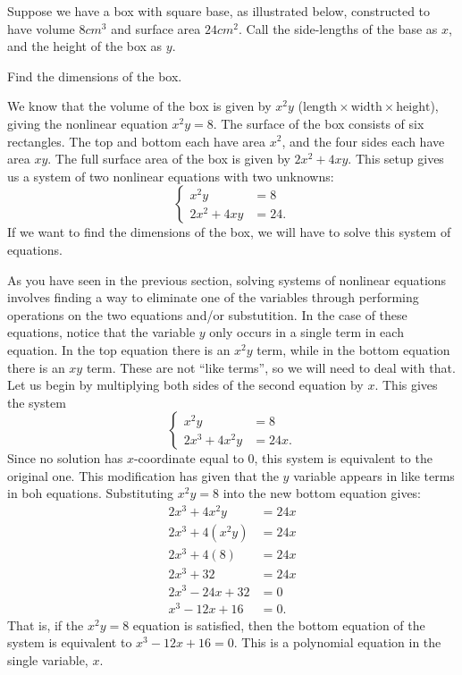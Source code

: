 \documentclass[nooutcomes]{ximera}
\begin{document}
	\begin{exercise}
		Suppose we have a box with square base, as illustrated below, constructed to have volume $8 cm^3$ and surface area $24 cm^2$. 
		Call the side-lengths of the base as $x$, and the height of the box as $y$.
		\begin{image}
		\end{image}
		Find the dimensions of the box.
		
		\begin{explanation}	
			We know that the volume of the box is given by $x^2y$ ($\text{length} \times \text{width} \times \text{height}$), giving the nonlinear equation
			 $x^2y = 8$. The surface of the box consists of six rectangles. The top and bottom each have area $x^2$, and the four sides each have 
			 area $xy$. The full surface area of the box is given by $2x^2 + 4xy$.
			This setup gives us a system of two nonlinear equations with two unknowns:
			$$	\begin{cases}
					x^2 y &= 8\\
					2x^2 + 4xy &= 24.
				\end{cases}	$$
			If we want to find the dimensions of the box, we will have to solve this system of equations.
			
			As you have seen in the previous section, solving systems of nonlinear equations involves finding a way to eliminate one of the variables through 
			performing operations on the two equations and/or substutition. In the case of these equations, notice that the variable $y$ only occurs in a single
			term in each equation. In the top equation there is an $x^2 y$ term, while in the bottom equation there is an $xy$ term. These are not 
			``like terms'', so we will need to deal with that. Let us begin by multiplying both sides of the second equation by $x$. This gives the system
			$$	\begin{cases}
					x^2 y &= 8\\
					2x^3 + 4x^2y &= 24x.
				\end{cases}	$$
			Since no solution has $x$-coordinate equal to $0$, this system is equivalent to the original one. This modification has given that the $y$ variable 
			appears in like terms in boh equations. Substituting $x^2y = 8$ into the new bottom equation gives:
			\begin{align*}
				2x^3 + 4x^2 y &= 24x\\
				2x^3 + 4\left(x^2 y\right) &= 24x\\
				2x^3 + 4\left(8\right) &= 24x\\
				2x^3 + 32 &= 24x\\
				2x^3 - 24x + 32 &= 0\\
				x^3 - 12x + 16 &= 0.
			\end{align*}
			That is, if the $x^2y=8$ equation is satisfied, then the bottom equation of the system is equivalent to $x^3-12x+16=0$. This is a polynomial 
			equation in the single variable, $x$.
			

\end{explanation}
\end{exercise}
\end{document}

